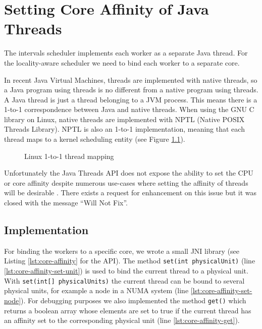 
\chapter{Setting Core Affinity of Java Threads}
\label{chap:appendix-core-affinity}

The intervals scheduler implements each worker as a separate Java
thread. For the locality-aware scheduler we need to bind each worker
to a separate core.

In recent Java Virtual Machines, threads are implemented with native
threads, so a Java program using threads is no different from a native
program using threads. A Java thread is just a thread belonging to a
JVM process. This means there is a 1-to-1 correspondence between Java
and native threads. When using the GNU C library on Linux, native
threads are implemented with NPTL (Native POSIX Threads Library). NPTL
is also an 1-to-1 implementation, meaning that each thread maps to a
kernel scheduling entity (see Figure
\ref{fig:core-affinity-thread-mapping}).

\begin{figure}[htb]
  \centering
  \caption{Linux 1-to-1 thread mapping}
  \label{fig:core-affinity-thread-mapping}
\end{figure}

Unfortunately the Java Threads API does not expose the ability to set
the CPU or core affinity despite numerous use-cases where setting the
affinity of threads will be desirable \cite{Love2003, Dow2005,
  Foong2008}.  There exists a request for enhancement
\cite{Oracle1999} on this issue but it was closed with the message
``Will Not Fix''.


\section{Implementation}
\label{sec:appendix-core-affinity-implementation}

For binding the workers to a specific core, we wrote a small JNI
library (see Listing \ref{lst:core-affinity} for the API). The method
\lstinline!set(int physicalUnit)!  (line
\ref{lst:core-affinity-set-unit}) is used to bind the current thread
to a physical unit. With \lstinline!set(int[] physicalUnits)! the
current thread can be bound to several physical units, for example a
node in a NUMA system (line \ref{lst:core-affinity-set-node}). For
debugging purposes we also implemented the method \lstinline!get()!
which returns a boolean array whose elements are set to true if the
current thread has an affinity set to the corresponding physical unit
(line \ref{lst:core-affinity-get}).

